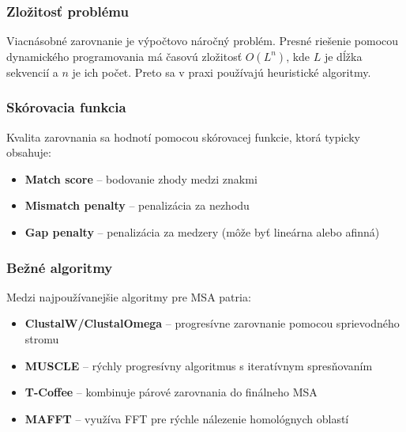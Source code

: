 \subsubsection{Zložitosť problému}

Viacnásobné zarovnanie je výpočtovo náročný problém. Presné riešenie pomocou dynamického programovania má časovú zložitosť $O(L^n)$, kde $L$ je dĺžka sekvencií a $n$ je ich počet. Preto sa v praxi používajú heuristické algoritmy.

\subsubsection{Skórovacia funkcia}

Kvalita zarovnania sa hodnotí pomocou skórovacej funkcie, ktorá typicky obsahuje:

\begin{itemize}
    \item \textbf{Match score} -- bodovanie zhody medzi znakmi
    \item \textbf{Mismatch penalty} -- penalizácia za nezhodu
    \item \textbf{Gap penalty} -- penalizácia za medzery (môže byť lineárna alebo afinná)
\end{itemize}

\subsubsection{Bežné algoritmy}

Medzi najpoužívanejšie algoritmy pre MSA patria:

\begin{itemize}
    \item \textbf{ClustalW/ClustalOmega} -- progresívne zarovnanie pomocou sprievodného stromu
    \item \textbf{MUSCLE} -- rýchly progresívny algoritmus s iteratívnym spresňovaním
    \item \textbf{T-Coffee} -- kombinuje párové zarovnania do finálneho MSA
    \item \textbf{MAFFT} -- využíva FFT pre rýchle nálezenie homológnych oblastí
\end{itemize}